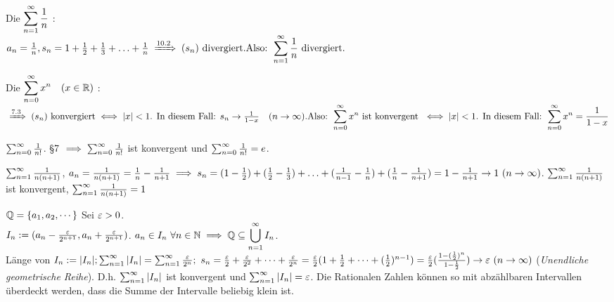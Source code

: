 \documentclass[a4paper,oneside,DIV15,BCOR12mm]{scrbook}
\begin{document}
\begin{beispiele}
\item Die  $\displaystyle{\sum_{n=1}^{\infty}{\frac{1}{n}}}$ :\\
$a_n = \frac{1}{n}, s_n = 1+\frac{1}{2}+\frac{1}{3}+\ldots+\frac{1}{n} \folgtnach{10.2} (s_n) \text{ divergiert.}\\
\text{Also: }\displaystyle\reihe{\frac{1}{n}}\text{ divergiert.}$

\item Die  $\displaystyle{\sum_{n=0}^{\infty}{x^n}}\quad(x\in\mathbb{R})$ :\\
$\folgtnach{7.3} (s_n)\text{ konvergiert} \equizu |x| < 1 \text{. In diesem Fall: } s_n \to \frac{1}{1-x}\quad(n\to\infty).\\
\text{Also: } \displaystyle\reihenull{x^n} \text{ ist konvergent } \equizu |x| < 1 \text{. In diesem Fall: } \displaystyle\reihenull{x^n} = \frac{1}{1-x}$

\item $\sum_{n=0}^{\infty}{\frac{1}{n!}}$. §7 $\implies \sum_{n=0}^{\infty}{\frac{1}{n!}}$ ist konvergent und $\sum_{n=0}^{\infty}{\frac{1}{n!}} = e$.

\item $\sum_{n=1}^{\infty}{\frac{1}{n(n+1)}}$, $a_n=\frac{1}{n(n+1)} = \frac{1}{n} - \frac{1}{n+1} \implies s_n = (1-\frac{1}{2})+(\frac{1}{2} - \frac{1}{3})+\ldots+(\frac{1}{n-1}-\frac{1}{n}) + (\frac{1}n - \frac{1}{n+1}) = 1- \frac{1}{n+1} \to 1 \ (n\to\infty)$. $\sum_{n=1}^{\infty}{\frac{1}{n(n+1)}}$ ist konvergent, $\sum_{n=1}^{\infty}{\frac{1}{n(n+1)}} = 1$
\item $\mathbb{Q}=\{a_1, a_2, \cdots\}$ Sei $\varepsilon>0$.\\ $I_n:=(a_n-\frac{\varepsilon}{2^{n+1}}, a_n+\frac{\varepsilon}{2^{n+1}})$. $a_n \in I_n \ \forall n\in\mathbb{N} \implies \mathbb{Q} \subseteq \displaystyle \bigcup_{n=1}^{\infty}I_n$. \\
Länge von $I_n:=|I_n|; \reihe{|I_n|}=\reihe{\frac{\ep}{2^n}};\ s_n=\frac{\ep}{2}+\frac{\ep}{2^2}+\cdots+\frac{\ep}{2^n}=\frac{\ep}{2}(1+\frac{1}{2}+\cdots+(\frac{1}{2})^{n-1})=\frac{\ep}{2}(\frac{1-(\frac{1}{2})^n}{1-\frac{1}{2}})\to\ep\ (n\to\infty)$
(\emph{Unendliche geometrische Reihe}). D.h. $\sum_{n=1}^{\infty}{|I_n|}$ ist konvergent und $\sum_{n=1}^{\infty}{|I_n|}=\varepsilon$. Die Rationalen Zahlen können so mit abzählbaren Intervallen überdeckt werden, dass die Summe der Intervalle beliebig klein ist.
\end{beispiele}
\end{document}
